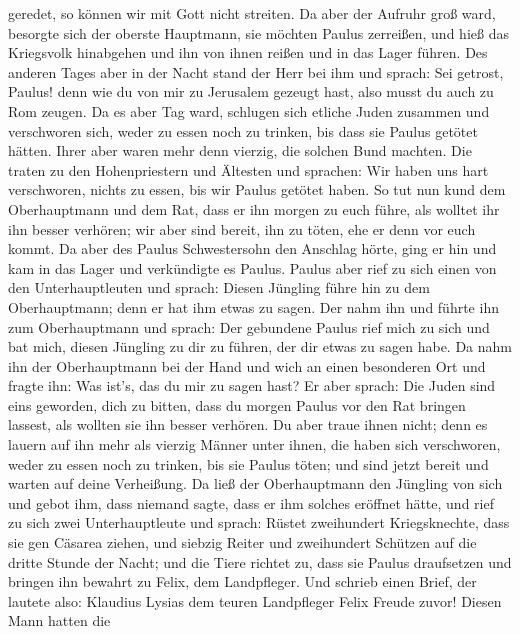 geredet, so können wir mit Gott nicht streiten.  Da aber
der Aufruhr groß ward, besorgte sich der oberste Hauptmann, sie möchten
Paulus zerreißen, und hieß das Kriegsvolk hinabgehen und ihn von ihnen
reißen und in das Lager führen.  Des anderen Tages aber in
der Nacht stand der Herr bei ihm und sprach: Sei getrost, Paulus! denn
wie du von mir zu Jerusalem gezeugt hast, also musst du auch zu Rom
zeugen.  Da es aber Tag ward, schlugen sich etliche Juden
zusammen und verschworen sich, weder zu essen noch zu trinken, bis dass
sie Paulus getötet hätten.  Ihrer aber waren mehr denn
vierzig, die solchen Bund machten.  Die traten zu den
Hohenpriestern und Ältesten und sprachen: Wir haben uns hart
verschworen, nichts zu essen, bis wir Paulus getötet haben.
 So tut nun kund dem Oberhauptmann und dem Rat, dass er ihn
morgen zu euch führe, als wolltet ihr ihn besser verhören; wir aber sind
bereit, ihn zu töten, ehe er denn vor euch kommt.  Da aber
des Paulus Schwestersohn den Anschlag hörte, ging er hin und kam in das
Lager und verkündigte es Paulus.  Paulus aber rief zu sich
einen von den Unterhauptleuten und sprach: Diesen Jüngling führe hin zu
dem Oberhauptmann; denn er hat ihm etwas zu sagen.  Der
nahm ihn und führte ihn zum Oberhauptmann und sprach: Der gebundene
Paulus rief mich zu sich und bat mich, diesen Jüngling zu dir zu führen,
der dir etwas zu sagen habe.  Da nahm ihn der Oberhauptmann
bei der Hand und wich an einen besonderen Ort und fragte ihn: Was ist's,
das du mir zu sagen hast?  Er aber sprach: Die Juden sind
eins geworden, dich zu bitten, dass du morgen Paulus vor den Rat bringen
lassest, als wollten sie ihn besser verhören.  Du aber
traue ihnen nicht; denn es lauern auf ihn mehr als vierzig Männer unter
ihnen, die haben sich verschworen, weder zu essen noch zu trinken, bis
sie Paulus töten; und sind jetzt bereit und warten auf deine Verheißung.
 Da ließ der Oberhauptmann den Jüngling von sich und gebot
ihm, dass niemand sagte, dass er ihm solches eröffnet hätte,
 und rief zu sich zwei Unterhauptleute und sprach: Rüstet
zweihundert Kriegsknechte, dass sie gen Cäsarea ziehen, und siebzig
Reiter und zweihundert Schützen auf die dritte Stunde der Nacht;
 und die Tiere richtet zu, dass sie Paulus draufsetzen und
bringen ihn bewahrt zu Felix, dem Landpfleger.  Und schrieb
einen Brief, der lautete also:  Klaudius Lysias dem teuren
Landpfleger Felix Freude zuvor!  Diesen Mann hatten die
